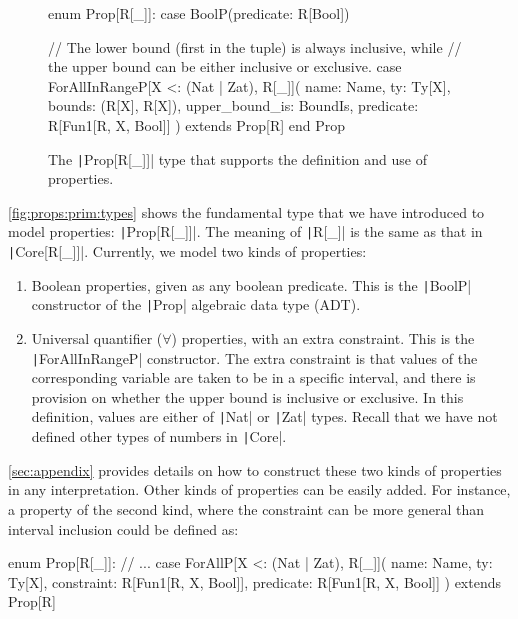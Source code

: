 \documentclass[11pt]{article}
\renewcommand{\vref}[1]{\autoref{#1} \vpageref{#1}}{}
\newcommand{\ScalaI}[1]{\texttt|#1|}
\begin{document}
\begin{figure}[tb]
\begin{ScalaBlock}
enum Prop[R[_]]:
  case BoolP(predicate: R[Bool])
  
  // The lower bound (first in the tuple) is always inclusive, while
  // the upper bound can be either inclusive or exclusive.
  case ForAllInRangeP[X <: (Nat | Zat), R[_]](
    name: Name,
    ty: Ty[X],
    bounds: (R[X], R[X]),
    upper_bound_is: BoundIs,
    predicate: R[Fun1[R, X, Bool]]
  ) extends Prop[R]
end Prop
\end{ScalaBlock}
\caption{The \ScalaI{Prop[R[_]]} type that supports the definition and use of properties.}
\label{fig:props:prim:types}
\hrulefill
\end{figure}

\vref{fig:props:prim:types} shows the fundamental type that we have introduced to model properties: \ScalaI{Prop[R[_]]}. The meaning of \ScalaI{R[_]} is the same as that in \ScalaI{Core[R[_]]}. Currently, we model two kinds of properties:

\begin{enumerate}
  \item Boolean properties, given as any boolean predicate. This is the \ScalaI{BoolP} constructor of the \ScalaI{Prop} algebraic data type (ADT).
  
  \item Universal quantifier ($\forall$) properties, with an extra constraint. This is the \ScalaI{ForAllInRangeP} constructor. The extra constraint is that values of the corresponding variable are taken to be in a specific interval, and there is provision on whether the upper bound is inclusive or exclusive. In this definition, values are either of \ScalaI{Nat} or \ScalaI{Zat} types. Recall that we have not defined other types of numbers in \ScalaI{Core}.
\end{enumerate}

\autoref{sec:appendix} provides details on how to construct these two kinds of properties in any interpretation. Other kinds of properties can be easily added. For instance, a property of the second kind, where the constraint can be more general than interval inclusion could be defined as:

\begin{ScalaBlockSimple}
enum Prop[R[_]]:
  // ...
  case ForAllP[X <: (Nat | Zat), R[_]](
    name: Name,
    ty: Ty[X],
    constraint: R[Fun1[R, X, Bool]], 
    predicate: R[Fun1[R, X, Bool]]
  ) extends Prop[R]
\end{ScalaBlockSimple}
\end{document}
